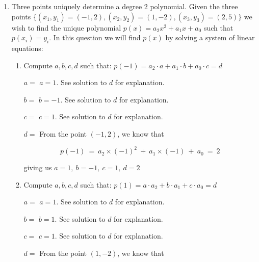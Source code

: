 \documentclass[11pt, preview]{standalone} %
\begin{document}
\begin{enumerate}
\begin{enumerate}
\begin{Choices}
\begin{itemize}
\end{itemize}
\end{Choices}
\end{enumerate}

. 

\item Three points uniquely determine a degree $2$ polynomial. Given the three points $\{(x_1,y_1) = (-1,2), (x_2,y_2) = (1,-2),(x_3,y_3) = (2,5)\}$ we wish to find the unique polynomial $p(x) = a_2 x^2 + a_1 x + a_0$ such that $p(x_i) = y_i$.  In this question we will find $p(x)$ by solving a system of linear equations:
\begin{enumerate}
\item Compute $a,b,c,d$ such that: $p(-1) =  a_2 \cdot a +  a_1  \cdot b + a_0  \cdot c = d$
\begin{Freeform}{1}
$a = $
\Solution $a = 1$. See solution to $d$ for explanation.
\end{Freeform}
\begin{Freeform}{-1}
$b = $
\Solution $b = -1$. See solution to $d$ for explanation.
\end{Freeform}
\begin{Freeform}{1}
$c = $
\Solution $c = 1$. See solution to $d$ for explanation.
\end{Freeform}
\begin{Freeform}{2}
$d = $
\Solution From the point $(-1, 2)$, we know that

$$p(-1)\ =\ a_2 \times (-1)^2\ +\ a_1 \times (-1)\ +\ a_0\ =\ 2$$

giving us $a = 1,\ b = -1,\ c = 1,\ d = 2$
\end{Freeform}

\item Compute $a,b,c,d$ such that: $p(1) = a \cdot a_2 + b \cdot a_1 + c \cdot a_0 = d$
\begin{Freeform}{1}
$a = $
\Solution $a = 1$. See solution to $d$ for explanation.
\end{Freeform}
\begin{Freeform}{1}
$b = $
\Solution $b = 1$. See solution to $d$ for explanation.
\end{Freeform}
\begin{Freeform}{1}
$c = $
\Solution $c = 1$. See solution to $d$ for explanation.
\end{Freeform}
\begin{Freeform}{-2}
$d = $
\Solution From the point $(1, -2)$, we know that 


\end{Freeform}
\end{enumerate}
\end{enumerate}
\end{document}
